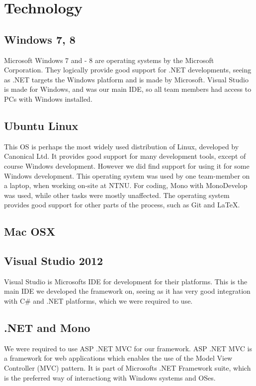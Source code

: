 \documentclass[12pt, a4paper]{article}
\begin{document}
\section{Technology}

\subsection{Windows 7, 8}
Microsoft Windows 7 and - 8 are operating systems by the Microsoft Corporation. They logically provide good support for .NET developments, seeing as .NET targets the Windows platform and is made by Microsoft. Visual Studio is made for Windows, and was our main IDE, so all team members had access to PCs with Windows installed.

\subsection{Ubuntu Linux}
This OS is perhaps the most widely used distribution of Linux, developed by Canonical Ltd. It provides good support for many development tools, except of course Windows development. However we did find support for using it for some Windows development.
This operating system was used by one team-member on a laptop, when working on-site at NTNU. For coding, Mono with MonoDevelop was used, while other tasks were mostly unaffected. The operating system provides good support for other parts of the process, such as Git and \LaTeX.

\subsection{Mac OSX}

\subsection{Visual Studio 2012}
Visual Studio is Microsofts IDE for development for their platforms. This is the main IDE we developed the framework on, seeing as it has very good integration with C\# and .NET platforms, which we were required to use.

\subsection{.NET and Mono}
We were required to use ASP .NET MVC for our framework. ASP .NET MVC is a framework for web applications which enables the use of the Model View Controller (MVC) pattern. It is part of Microsofts .NET Framework suite, which is the preferred way of interactiong with Windows systems and OSes.
\end{document}
